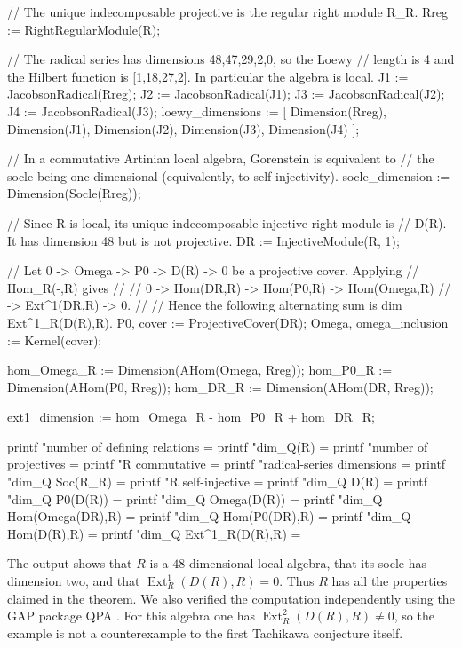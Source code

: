 \documentclass[a4paper]{amsart}
\theoremstyle{definition}
\theoremstyle{remark}
\numberwithin{equation}{section}
\newcommand{\Ext}{\operatorname{Ext}}
\begin{document}
\begin{MagmaCode}
// The unique indecomposable projective is the regular right module R_R.
Rreg := RightRegularModule(R);

// The radical series has dimensions 48,47,29,2,0, so the Loewy
// length is 4 and the Hilbert function is [1,18,27,2]. In particular the algebra is local.
J1 := JacobsonRadical(Rreg);
J2 := JacobsonRadical(J1);
J3 := JacobsonRadical(J2);
J4 := JacobsonRadical(J3);
loewy_dimensions := [
    Dimension(Rreg), Dimension(J1), Dimension(J2),
    Dimension(J3), Dimension(J4)
];

// In a commutative Artinian local algebra, Gorenstein is equivalent to
// the socle being one-dimensional (equivalently, to self-injectivity).
socle_dimension := Dimension(Socle(Rreg));

// Since R is local, its unique indecomposable injective right module is
// D(R).  It has dimension 48 but is not projective.
DR := InjectiveModule(R, 1);

// Let 0 -> Omega -> P0 -> D(R) -> 0 be a projective cover.  Applying
// Hom_R(-,R) gives
//
//   0 -> Hom(DR,R) -> Hom(P0,R) -> Hom(Omega,R)
//     -> Ext^1(DR,R) -> 0.
//
// Hence the following alternating sum is dim Ext^1_R(D(R),R).
P0, cover := ProjectiveCover(DR);
Omega, omega_inclusion := Kernel(cover);

hom_Omega_R := Dimension(AHom(Omega, Rreg));
hom_P0_R    := Dimension(AHom(P0,    Rreg));
hom_DR_R    := Dimension(AHom(DR,    Rreg));

ext1_dimension := hom_Omega_R - hom_P0_R + hom_DR_R;

printf "number of defining relations = %
printf "dim_Q(R)                    = %
printf "number of projectives       = %
printf "R commutative               = %
printf "radical-series dimensions   = %
printf "dim_Q Soc(R_R)              = %
printf "R self-injective            = %
printf "dim_Q D(R)                  = %
printf "dim_Q P0(D(R))              = %
printf "dim_Q Omega(D(R))           = %
printf "dim_Q Hom(Omega(DR),R)      = %
printf "dim_Q Hom(P0(DR),R)         = %
printf "dim_Q Hom(D(R),R)           = %
printf "dim_Q Ext^1_R(D(R),R)       = %
\end{MagmaCode}
The output shows that $R$ is a $48$-dimensional local algebra, that its socle has dimension two, and that $\Ext_R^1(D(R),R)=0$.  Thus $R$ has all the properties claimed in the theorem.  We also verified the computation independently using the GAP package QPA \cite{QPA}.  For this algebra one has $\Ext_R^2(D(R),R)\neq0$, so the example is not a counterexample to the first Tachikawa conjecture itself.
\end{document}
